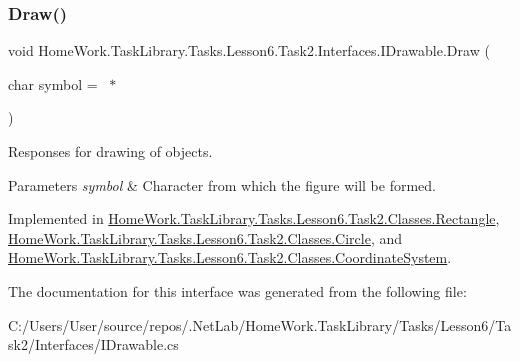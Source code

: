 \subsubsection{\texorpdfstring{Draw()}{Draw()}}
{\footnotesize\ttfamily void Home\+Work.\+Task\+Library.\+Tasks.\+Lesson6.\+Task2.\+Interfaces.\+I\+Drawable.\+Draw (\begin{DoxyParamCaption}\item[{char}]{symbol = {\ttfamily \textquotesingle{}~$\ast$\textquotesingle{}} }\end{DoxyParamCaption})}



Responses for drawing of objects. 


\begin{DoxyParams}{Parameters}
{\em symbol} & Character from which the figure will be formed.\\
\hline
\end{DoxyParams}


Implemented in \mbox{\hyperlink{class_home_work_1_1_task_library_1_1_tasks_1_1_lesson6_1_1_task2_1_1_classes_1_1_rectangle_ac7cf849ea33764185a7c82bb20d57e0c}{Home\+Work.\+Task\+Library.\+Tasks.\+Lesson6.\+Task2.\+Classes.\+Rectangle}}, \mbox{\hyperlink{class_home_work_1_1_task_library_1_1_tasks_1_1_lesson6_1_1_task2_1_1_classes_1_1_circle_abaa706e9da35ccbbec897327cdf8bbee}{Home\+Work.\+Task\+Library.\+Tasks.\+Lesson6.\+Task2.\+Classes.\+Circle}}, and \mbox{\hyperlink{class_home_work_1_1_task_library_1_1_tasks_1_1_lesson6_1_1_task2_1_1_classes_1_1_coordinate_system_a2aed5ec74fa1b6837f9db49afa382dcf}{Home\+Work.\+Task\+Library.\+Tasks.\+Lesson6.\+Task2.\+Classes.\+Coordinate\+System}}.



The documentation for this interface was generated from the following file\+:\begin{DoxyCompactItemize}
\item 
C\+:/\+Users/\+User/source/repos/.\+Net\+Lab/\+Home\+Work.\+Task\+Library/\+Tasks/\+Lesson6/\+Task2/\+Interfaces/I\+Drawable.\+cs\end{DoxyCompactItemize}
